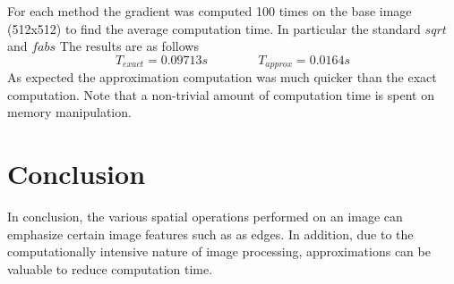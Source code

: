 \documentclass[12pt,letterpaper]{article}
\begin{document}
For each method the gradient was computed 100 times on the base image (512x512) to find the average computation time. In particular the standard $sqrt$ and $fabs$   The results are as follows \[
T_{exact} = 0.09713s \qquad \qquad T_{approx} = 0.0164s
\]
As expected the approximation computation  was much quicker than the exact computation. Note that a non-trivial amount of computation time is spent on memory manipulation.


\section{Conclusion}
In conclusion, the various spatial operations performed on an image can emphasize certain image features such as as edges. In addition, due to the computationally intensive nature of image processing, approximations can be valuable to reduce computation time.
\end{document}
